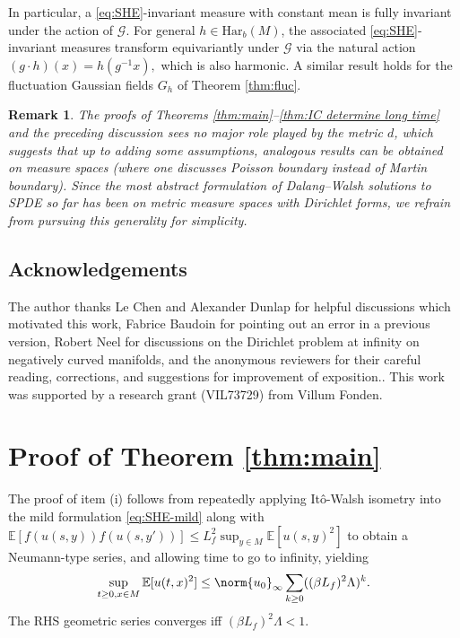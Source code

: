 \documentclass{article}
\newtheorem{remark}[theorem]{Remark}
\numberwithin{theorem}{section}
\def\EE{\mathbb{E}} %
\begin{document}
In particular, a \eqref{eq:SHE}-invariant measure with constant mean is fully invariant under the action of $\mathcal{G}$. For general $h \in \mathrm{Har}_b(M)$, the associated \eqref{eq:SHE}-invariant measures transform equivariantly under $\mathcal{G}$ via the natural action \((g \cdot h)(x) = h(g^{-1}x),\) which is also harmonic. A similar result holds for the fluctuation Gaussian fields $G_h$ of Theorem \ref{thm:fluc}.

\begin{remark}
    The proofs of Theorems \ref{thm:main}--\ref{thm:IC determine long time} and the preceding discussion sees no major role played by the metric $d$, which suggests that up to adding some assumptions, analogous results can be obtained on measure spaces (where one discusses Poisson boundary instead of Martin boundary). Since the most abstract formulation of Dalang--Walsh solutions to SPDE so far has been on metric measure spaces with Dirichlet forms\cite{BCHOTW}, we refrain from pursuing this generality for simplicity.
\end{remark}

\subsection{Acknowledgements}
The author thanks Le Chen and Alexander Dunlap for helpful discussions which motivated this work, Fabrice Baudoin for pointing out an error in a previous version, Robert Neel for discussions on the Dirichlet problem at infinity on negatively curved manifolds, and the anonymous reviewers for their careful reading, corrections, and suggestions for improvement of exposition.. This work was supported by a research grant (VIL73729) from Villum Fonden.




\section{Proof of Theorem \ref{thm:main}}\label{sec:pf main}

The proof of item (i) follows from repeatedly applying It\^o-Walsh isometry into the mild formulation \eqref{eq:SHE-mild} along with $\EE[f(u(s,y))f(u(s,y'))]\leq L_f^2\sup_{y\in M}\EE[u(s,y)^2]$ to obtain a Neumann-type series, and allowing time to go to infinity, yielding \[\sup_{t\ge 0,x\in M}\EE[u(t,x)^2]\leq \norm{u_0}_\infty \sum_{k\ge 0}((\beta L_f)^2\Lambda)^k.\] The RHS geometric series converges iff \((\beta L_f)^2 \Lambda<1\).\\
\end{document}
